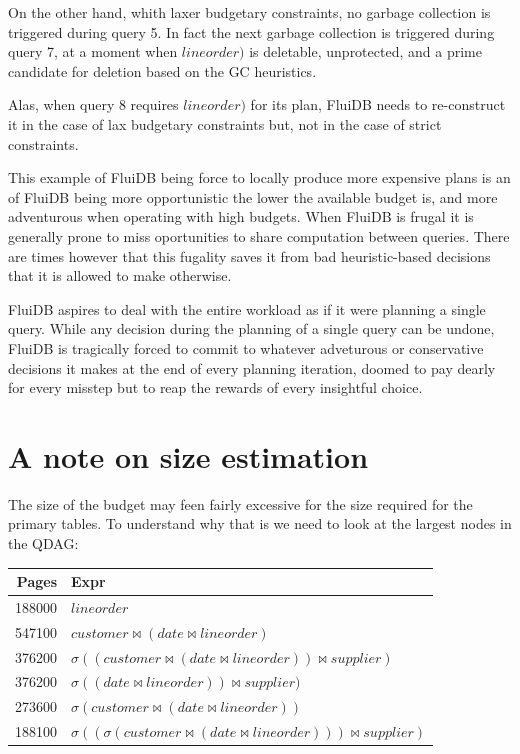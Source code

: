On the other hand, whith laxer budgetary constraints, no garbage
collection is triggered during query 5. In fact the next garbage
collection is triggered during query 7, at a moment when
\(\mathit{lineorder})\) is deletable, unprotected, and a prime
candidate for deletion based on the GC heuristics.

Alas, when query 8 requires \(\mathit{lineorder})\) for its plan,
FluiDB needs to re-construct it in the case of lax budgetary
constraints but, not in the case of strict constraints.


This example of FluiDB being force to locally produce more expensive
plans is an of FluiDB being more opportunistic the lower the available
budget is, and more adventurous when operating with high budgets. When
FluiDB is frugal it is generally prone to miss oportunities to share
computation between queries. There are times however that this
fugality saves it from bad heuristic-based decisions that it is
allowed to make otherwise.

FluiDB aspires to deal with the entire workload as if it were planning
a single query. While any decision during the planning of a single
query can be undone, FluiDB is tragically forced to commit to whatever
adveturous or conservative decisions it makes at the end of every
planning iteration, doomed to pay dearly for every misstep but to reap
the rewards of every insightful choice.

\section{A note on size estimation}
\label{sec:size_estimation_problems}
The size of the budget may feen fairly excessive for the size required
for the primary tables. To understand why that is we need to look at
the largest nodes in the QDAG:

\begin{center}
\begin{tabular}{rl}
Pages & Expr\\
\hline
188000 & \(lineorder\)\\
547100 & \(customer \Join (date \Join lineorder)\)\\
376200 & \(\sigma ((customer \Join (date \Join lineorder)) \Join supplier)\)\\
376200 & \(\sigma ((date \Join lineorder)) \Join supplier)\)\\
273600 & \(\sigma (customer \Join (date \Join lineorder))\)\\
188100 & \(\sigma ((\sigma (customer \Join (date \Join lineorder))) \Join supplier)\)\\
\end{tabular}
\end{center}

